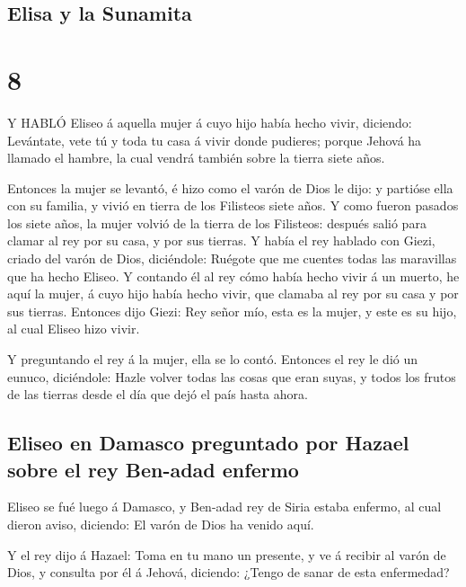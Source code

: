 \hypertarget{elisa-y-la-sunamita}{%
\subsection{Elisa y la Sunamita}\label{elisa-y-la-sunamita}}

\hypertarget{section-7}{%
\section{8}\label{section-7}}

 Y HABLÓ Eliseo á aquella mujer á cuyo hijo había hecho
vivir, diciendo: Levántate, vete tú y toda tu casa á vivir donde
pudieres; porque Jehová ha llamado el hambre, la cual vendrá también
sobre la tierra siete años.

 Entonces la mujer se levantó, é hizo como el varón de Dios
le dijo: y partióse ella con su familia, y vivió en tierra de los
Filisteos siete años.  Y como fueron pasados los siete años,
la mujer volvió de la tierra de los Filisteos: después salió para clamar
al rey por su casa, y por sus tierras.  Y había el rey
hablado con Giezi, criado del varón de Dios, diciéndole: Ruégote que me
cuentes todas las maravillas que ha hecho Eliseo.  Y
contando él al rey cómo había hecho vivir á un muerto, he aquí la mujer,
á cuyo hijo había hecho vivir, que clamaba al rey por su casa y por sus
tierras. Entonces dijo Giezi: Rey señor mío, esta es la mujer, y este es
su hijo, al cual Eliseo hizo vivir.

 Y preguntando el rey á la mujer, ella se lo contó. Entonces
el rey le dió un eunuco, diciéndole: Hazle volver todas las cosas que
eran suyas, y todos los frutos de las tierras desde el día que dejó el
país hasta ahora.

\hypertarget{eliseo-en-damasco-preguntado-por-hazael-sobre-el-rey-ben-adad-enfermo}{%
\subsection{Eliseo en Damasco preguntado por Hazael sobre el rey
Ben-adad
enfermo}\label{eliseo-en-damasco-preguntado-por-hazael-sobre-el-rey-ben-adad-enfermo}}

 Eliseo se fué luego á Damasco, y Ben-adad rey de Siria
estaba enfermo, al cual dieron aviso, diciendo: El varón de Dios ha
venido aquí.

 Y el rey dijo á Hazael: Toma en tu mano un presente, y ve á
recibir al varón de Dios, y consulta por él á Jehová, diciendo: ¿Tengo
de sanar de esta enfermedad?

